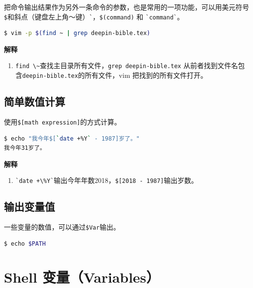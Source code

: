 \documentclass[doctor,openright,twoside]{sjtuthesis}
\providecommand{\tightlist}{%
    \setlength{\itemsep}{0pt}\setlength{\parskip}{0pt}}
\newcommand{\passthrough}[1]{#1}
\theoremstyle{plain}
\theoremstyle{definition}
\theoremstyle{remark}
\theoremstyle{ocrenumbox}
\theoremstyle{plain}
\begin{document}
把命令输出结果作为另外一条命令的参数，也是常用的一项功能，可以用美元符号\passthrough{\lstinline!$!}和斜点（键盘左上角～键）\passthrough{\lstinline!`!}，\passthrough{\lstinline!$(command)!}
和 \passthrough{\lstinline!`command`!}。

\begin{lstlisting}[language=bash]
$ vim -p $(find ~ | grep deepin-bible.tex)
\end{lstlisting}

\textbf{解释}

\begin{enumerate}
\def\labelenumi{\arabic{enumi}.}
\tightlist
\item
  \passthrough{\lstinline!find \~!}查找主目录所有文件，\passthrough{\lstinline!grep deepin-bible.tex!}
  从前者找到文件名包含\passthrough{\lstinline!deepin-bible.tex!}的所有文件，vim
  把找到的所有文件打开。
\end{enumerate}

\subsection{简单数值计算}

使用\passthrough{\lstinline!$[math expression]!}的方式计算。

\begin{lstlisting}[language=bash]
$ echo "我今年$[`date +%Y` - 1987]岁了。"
我今年31岁了。
\end{lstlisting}

\textbf{解释}

\begin{enumerate}
\def\labelenumi{\arabic{enumi}.}
\tightlist
\item
  \passthrough{\lstinline!`date +\%Y`!}输出今年年数2018，\passthrough{\lstinline!$[2018 - 1987]!}输出岁数。
\end{enumerate}

\subsection{输出变量值}

一些变量的数值，可以通过\passthrough{\lstinline!$Var!}输出。

\begin{lstlisting}[language=bash]
$ echo $PATH
\end{lstlisting}

\hypertarget{shell-variables}{%
\section{Shell 变量（Variables）}\label{shell-variables}}
\end{document}

